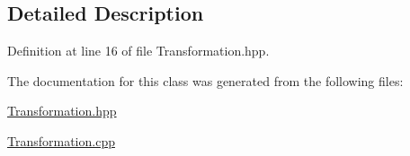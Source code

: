\subsection{Detailed Description}


Definition at line 16 of file Transformation.\-hpp.



The documentation for this class was generated from the following files\-:\begin{DoxyCompactItemize}
\item 
\hyperlink{_transformation_8hpp}{Transformation.\-hpp}\item 
\hyperlink{_transformation_8cpp}{Transformation.\-cpp}\end{DoxyCompactItemize}

